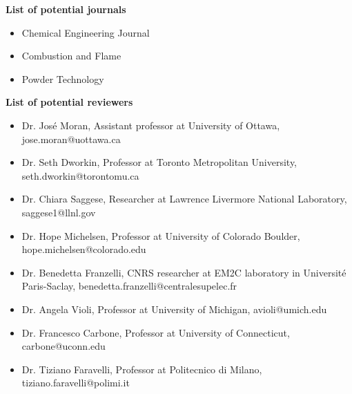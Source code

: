 \textbf{\large{List of potential journals}}
\vspace{0.3cm}
\begin{itemize}
	\item Chemical Engineering Journal
	\item Combustion and Flame
	\item Powder Technology
\end{itemize}

\vspace{1cm}
\textbf{\large{List of potential reviewers}}
\vspace{0.3cm}

\begin{itemize}
	\item Dr. José Moran, Assistant professor at University of Ottawa, jose.moran@uottawa.ca
	\item Dr. Seth Dworkin, Professor at Toronto Metropolitan University, seth.dworkin@torontomu.ca
	\item Dr. Chiara Saggese, Researcher at Lawrence Livermore National Laboratory, saggese1@llnl.gov
	\item Dr. Hope Michelsen, Professor at University of Colorado Boulder, hope.michelsen@colorado.edu
	\item Dr. Benedetta Franzelli, CNRS researcher at EM2C laboratory in Université Paris-Saclay, benedetta.franzelli@centralesupelec.fr
	\item Dr. Angela Violi, Professor at University of Michigan, avioli@umich.edu
	\item Dr. Francesco Carbone, Professor at University of Connecticut, carbone@uconn.edu
	\item Dr. Tiziano Faravelli, Professor at Politecnico di Milano, tiziano.faravelli@polimi.it
\end{itemize}